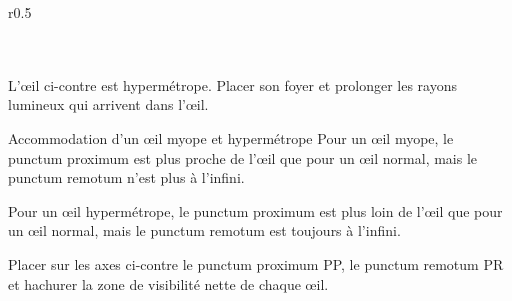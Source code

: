 \begin{wrapfigure}[10]{r}{0.5\linewidth}
  \centering
  \vspace*{-2pt}
   \\
   \\[8pt]

   \\
\end{wrapfigure}

\schematisation
L'œil ci-contre est hypermétrope.
Placer son foyer et prolonger les rayons lumineux qui arrivent dans l'œil.

\begin{doc}{Accommodation d'un œil myope et hypermétrope}
  Pour un œil myope, le punctum proximum est plus proche de l'œil que pour un œil normal, mais le punctum remotum n'est plus à l'infini.

  Pour un œil hypermétrope, le punctum proximum est plus loin de l'œil que pour un œil normal, mais le punctum remotum est toujours à l'infini.
\end{doc}

\schematisation
Placer sur les axes ci-contre le punctum proximum PP, le punctum remotum PR et hachurer la zone de visibilité nette de chaque œil.